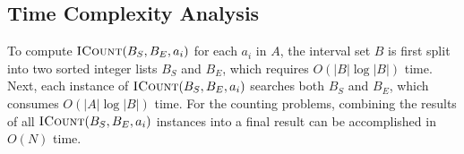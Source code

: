 \documentclass{bioinfo}
\begin{document}

        \subsection{Time Complexity Analysis}

        To compute $\textsc{ICount}(B_S,B_E,a_i)$ for each $a_i$ in $A$, the interval
        set $B$ is first split into two sorted integer lists $B_S$ and $B_E$,
        which requires $O(|B| \log |B|)$ time.  Next, each instance of
        $\textsc{ICount}(B_S,B_E,a_i)$ searches both $B_S$ and $B_E$, which consumes
        $O(|A| \log |B|)$ time.  For the counting problems, combining the
        results of all $\textsc{ICount}(B_S,B_E,a_i)$ instances into a final result can
        be accomplished in $O(N)$ time.  
        
\end{document}
